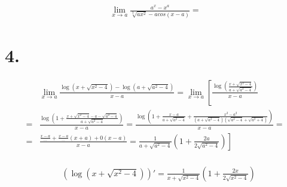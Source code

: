 \documentclass[a4paper, fontsize=10bp]{article} %
\begin{document}

\begin{align*}
    \lim  _{x \to a} \frac{a^x - x^a} {\sqrt[3]{ax^2} -acos(x-a)} = 
\end{align*}

\section*{4.}
\begin{align*}
    &\lim_{x \to a} \frac{\log(x + \sqrt{x^2 - 4}) - \log(a + \sqrt{a^2 - 4})}{x - a}  = \lim_{x \to a} \left[\frac{\log \left( \frac{x + \sqrt{x^2 - 4}}{a + \sqrt{a^2 - 4}} \right)} {x-a} \right.\\
    = &\left.\frac{\log \left( 1 + \frac{x + \sqrt{x^2 - 4} - a - \sqrt{a^2 - 4}}{a+\sqrt{a^2 - 4}} \right)}{x-a} \right. = \left. \frac{\log \left(   1 + \frac{x - a}{a + \sqrt{a^2 - 4}} + \frac{x^2 - a^2}{\left(a + \sqrt{a^2 - 4} \right) \left( \sqrt{a^2 - 4} + \sqrt{a^2 + 4}\right)} \right)}{x-a} = \right. \\   
    =&\left.\frac{\frac{x-a}{\cdots} + \frac{x-a}{\cdots}(x + a) + 0(x-a)}{x-a} = \frac{1}{a + \sqrt{a^2 - 4}}\left(1 + \frac{2a}{2\sqrt{a^2 -4}}\right)\right]\\
\end{align*}

\begin{align*}
    &\left(\log(x+\sqrt{x^2-4})\right)' = \frac{1}{x+\sqrt{x^2-4}}\left(1 + \frac{2x}{2\sqrt{x^2-4}}\right)
\end{align*}
\end{document}
